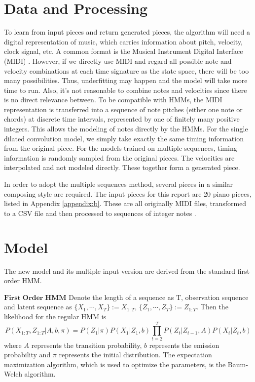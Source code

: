 \documentclass[10pt, oneside]{article}
\begin{document}
\section{Data and Processing}
To learn from input pieces and return generated pieces, the algorithm will need a digital representation of music, which carries information about pitch, velocity, clock signal, etc. A common format is the Musical Instrument Digital Interface (MIDI) \cite{midiwiki}. However, if we directly use MIDI and regard all possible note and velocity combinations at each time signature as the state space, there will be too many possibilities. Thus, underfitting may happen and the model will take more time to run. Also, it's not reasonable to combine notes and velocities since there is no direct relevance between. To be compatible with HMMs, the MIDI representation is transferred into a sequence of note pitches (either one note or chords) at discrete time intervals, represented by one of finitely many positive integers. This allows the modeling of notes directly by the HMMs. For the single dilated convolution model, we simply take exactly the same timing information from the original piece. For the models trained on multiple sequences, timing information is randomly sampled from the original pieces. The velocities are interpolated and not modeled directly. These together form a generated piece.

In order to adopt the multiple sequences method, several pieces in a similar composing style are required. 
The input pieces for this report are 20 piano pieces, listed in Appendix \ref{appendix:b}. These are all originally MIDI files, transformed to a CSV file  \cite{midicsv} and then processed to sequences of integer notes \cite{annagithub}. 
\section{Model}
The new model and its multiple input version are derived from the standard first order HMM.


$\mathbf{First \;Order\;HMM}$
Denote the length of a sequence as T, observation sequence and latent sequence as $\{ X_1,\cdots, X_T\}:=X_{1:T}$, $\{ Z_1,\cdots, Z_T\}:=Z_{1:T}$. Then the likelihood for the regular HMM is
$$
P\left(X_{1: T}, Z_{1: T}| A, b, \pi \right)=P\left(Z_{1}| \pi \right) P\left(X_{1} | Z_{1}, b \right) \prod_{t=2}^{T} P\left(Z_{t} | Z_{t-1}, A\right) P\left(X_{t} | Z_{t},b\right)
$$
where $A$ represents the transition probability, $b$ represents the emission probability and $\pi$ represents the initial distribution. The expectation maximization algorithm, which is used to optimize the parameters, is the Baum-Welch algorithm.\cite{tutorial}\\
\end{document}
